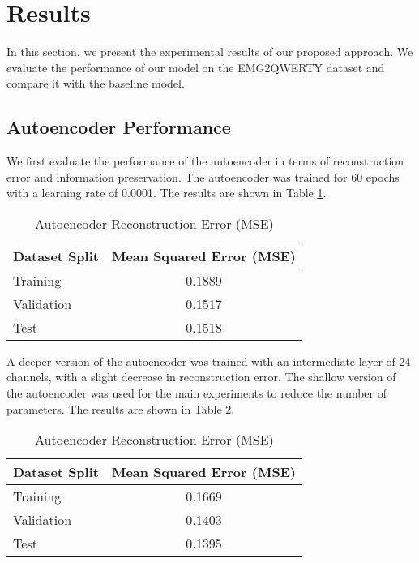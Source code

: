 \section{Results}\label{sec:results}

In this section, we present the experimental results of our proposed approach. We evaluate the performance of our model on the EMG2QWERTY dataset and compare it with the baseline model.

\subsection{Autoencoder Performance}

We first evaluate the performance of the autoencoder in terms of reconstruction error and information preservation. The autoencoder was trained for 60 epochs with a learning rate of 0.0001. The results are shown in Table \ref{tab:autoencoder_mse}.

\begin{table}[h]
    \centering
    \caption{Autoencoder Reconstruction Error (MSE)}
    \begin{tabular}{lc}
        \hline
        \textbf{Dataset Split} & \textbf{Mean Squared Error (MSE)} \\
        \hline
        Training               & 0.1889                            \\
        Validation             & 0.1517                            \\
        Test                   & 0.1518                            \\
        \hline
    \end{tabular}
    \label{tab:autoencoder_mse}
\end{table}

A deeper version of the autoencoder was trained with an intermediate layer of 24 channels, with a slight decrease in reconstruction error. The shallow version of the autoencoder was used for the main experiments to reduce the number of parameters. The results are shown in Table \ref{tab:autoencoder_mse_deep}.

\begin{table}[h]
    \centering
    \caption{Autoencoder Reconstruction Error (MSE)}
    \begin{tabular}{lc}
        \hline
        \textbf{Dataset Split} & \textbf{Mean Squared Error (MSE)} \\
        \hline
        Training               & 0.1669                            \\
        Validation             & 0.1403                            \\
        Test                   & 0.1395                            \\
        \hline
    \end{tabular}
    \label{tab:autoencoder_mse_deep}
\end{table}

